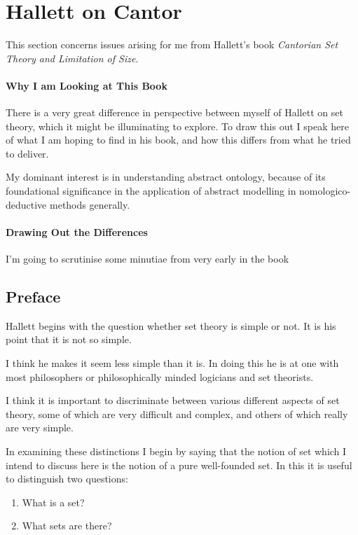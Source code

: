 
\section{Hallett on Cantor}

This section concerns issues arising for me from Hallett's book \emph{Cantorian Set Theory and Limitation of Size}\cite{hallettCSTALS}.

\paragraph{Why I am Looking at This Book}

There is a very great difference in perspective between myself of Hallett on set theory, which it might be illuminating to explore.
To draw this out I speak here of what I am hoping to find in his book, and how this differs from what he tried to deliver.

My dominant interest is in understanding abstract ontology, because of its foundational significance in the application of abstract modelling in nomologico-deductive methods generally.



\paragraph{Drawing Out the Differences}

I'm going to scrutinise some minutiae from very early in the book

\subsection{Preface}

Hallett begins with the question whether set theory is simple or not.
It is his point that it is not so simple.

I think he makes it seem less simple than it is.
In doing this he is at one with most philosophers or philosophically minded logicians and set theorists.

I think it is important to discriminate between various different aspects of set theory, some of which are very difficult and complex, and others of which really are very simple.

In examining these distinctions I begin by saying that the notion of set which I intend to discuss here is the notion of a pure well-founded set.
In this it is useful to distinguish two questions:
\begin{enumerate}
\item What is a set?
\item What sets are there?
\end{enumerate}

